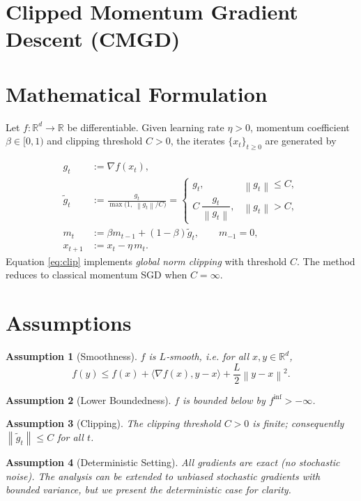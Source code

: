 \documentclass{article}
\newtheorem{assumption}{Assumption}
\newcommand{\norm}[1]{\left\lVert#1\right\rVert}
\newcommand{\grad}{\nabla}
\begin{document}
\section*{Clipped Momentum Gradient Descent (CMGD)}

\section*{Mathematical Formulation}
Let $f:\mathbb{R}^d\rightarrow\mathbb{R}$ be differentiable.  
Given learning rate $\eta>0$, momentum coefficient $\beta\in[0,1)$ and clipping threshold $C>0$, the iterates $\{x_t\}_{t\ge 0}$ are generated by  

\begin{align}
    g_t &:= \grad f(x_t), \label{eq:grad}\\[4pt]
    \tilde g_t &:= \frac{g_t}{\max\!\bigl(1,\; \norm{g_t}/C\bigr)} 
               = 
               \begin{cases}
                   g_t, & \norm{g_t}\le C,\\[2pt]
                   C\,\dfrac{g_t}{\norm{g_t}}, & \norm{g_t}> C,
               \end{cases}\label{eq:clip}\\[6pt]
    m_t &:= \beta m_{t-1} + (1-\beta)\tilde g_t,\qquad m_{-1}=0, \label{eq:momentum}\\[4pt]
    x_{t+1} &:= x_t - \eta\, m_t . \label{eq:update}
\end{align}
Equation \eqref{eq:clip} implements \emph{global norm clipping} with threshold $C$.  
The method reduces to classical momentum SGD when $C=\infty$.

\section*{Assumptions}
\begin{assumption}[Smoothness]\label{ass:smooth}
$f$ is $L$‑smooth, i.e. for all $x,y\in\mathbb{R}^d$,
\[
    f(y)\le f(x)+\langle \grad f(x),y-x\rangle+\frac{L}{2}\norm{y-x}^2 .
\]
\end{assumption}
\begin{assumption}[Lower Boundedness]\label{ass:lb}
$f$ is bounded below by $f^{\inf}>-\infty$.
\end{assumption}
\begin{assumption}[Clipping]\label{ass:clip}
The clipping threshold $C>0$ is finite; consequently $\norm{\tilde g_t}\le C$ for all $t$.
\end{assumption}
\begin{assumption}[Deterministic Setting]\label{ass:det}
All gradients are exact (no stochastic noise). The analysis can be extended to unbiased stochastic gradients with bounded variance, but we present the deterministic case for clarity.
\end{assumption}
\end{document}
